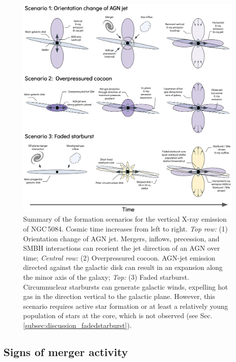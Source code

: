 \documentclass[modern]{CORE-AAS/aastex631}
\begin{document}
\begin{figure}[t!]
\begin{center}
% 
\includegraphics[trim={0 0 0 0}, clip, width = \textwidth]{FIGURES/scenarios_figure.png}
\caption{Summary of the formation scenarios for the vertical X-ray emission of NGC\,5084. Cosmic time increases from left to right. \emph{Top row:} (1) Orientation change of AGN jet. Mergers, inflows, precession, and SMBH interactions can reorient the jet direction of an AGN over time; \emph{Central row:} (2) Overpressured cocoon. AGN-jet emission directed against the galactic disk can result in an expansion along the minor axis of the galaxy; \emph{Top:} (3) Faded starburst. Circumnuclear starbursts can generate galactic winds, expelling hot gas in the direction vertical to the galactic plane. However, this scenario requires active star formation or at least a relatively young population of stars at the core, which is not observed (see Sec.\,\ref{subsec:discussion_fadedstarburst}).} 
\label{fig:NGC5084_scenarios}
\end{center}
\end{figure}


\subsection{Signs of merger activity}
\label{subsec:discussion_merger}
\end{document}
